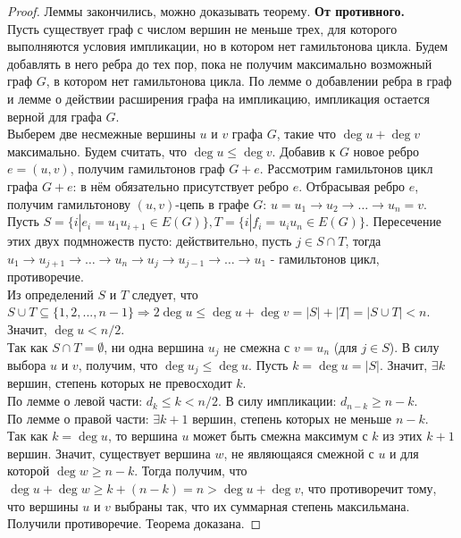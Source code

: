 \documentclass[10pt,a4paper]{article}
\begin{document}
\begin{enumerate}
\begin{proof}
	Леммы закончились, можно доказывать теорему. \textbf{От противного.}\\
	Пусть существует граф с числом вершин не меньше трех, для которого выполняются условия импликации, но в котором нет гамильтонова цикла. Будем добавлять в него ребра до тех пор, пока не получим максимально возможный граф $G$, в котором нет гамильтонова цикла. По лемме о добавлении ребра в граф и лемме о действии расширения графа на импликацию, импликация остается верной для графа $G$.\\
	Выберем две несмежные вершины $u$ и $v$ графа $G$, такие что $\deg u + \deg v$ максимально. Будем считать, что $\deg u \leq \deg v$. Добавив к $G$ новое ребро $e = (u,v)$, получим гамильтонов граф $G + e$. Рассмотрим гамильтонов цикл графа $G + e$: в нём обязательно присутствует ребро $e$. Отбрасывая ребро $e$, получим гамильтонову $(u, v)$-цепь в графе $G$: $u = u_1 \rightarrow u_2 \rightarrow \ldots \rightarrow u_n = v$.\\
	Пусть $S = \{ i | e_i = u_1 u_{i + 1} \in E(G)\}, T = \{ i |f_i = u_i u_n \in E(G)\}$. Пересечение этих двух подмножеств пусто: действительно, пусть $j \in S \cap T$, тогда $u_1 \rightarrow u_{j + 1} \rightarrow \ldots \rightarrow u_n \rightarrow u_j \rightarrow u_{j - 1} \rightarrow \ldots \rightarrow u_1$ - гамильтонов цикл, противоречие.\\
	Из определений $S$ и $T$ следует, что $S \cup T \subseteq \{1, 2, ..., n - 1 \} \Rightarrow 2 \deg u \leq \deg u + \deg v = |S| + |T| = |S \cup T| < n$. Значит, $\deg u < n/2$.\\
	Так как $S \cap T  = \emptyset$, ни одна вершина $ u_j $ не смежна с $ v = u_n $ (для $ j \in S $). В силу выбора $ u $ и $ v $, получим, что $ \deg u_j \leq \deg u $. Пусть $ k = \deg u = |S| $. Значит, $ \exists k $ вершин, степень которых не превосходит $k$.\\
	По лемме о левой части: $d_k \leq k < n/2$. В силу импликации: $ d_{n - k} \geq n - k$.\\
	По лемме о правой части: $\exists k + 1$ вершин, степень которых не меньше $n - k$.\\
	Так как $ k = \deg u $, то вершина $u$ может быть смежна максимум с $k$ из этих $k+1$ вершин. Значит, существует вершина $w$, не являющаяся смежной с $u$ и для которой $ \deg w \geq n - k $. Тогда получим, что $ \deg u + \deg w \geq k + (n - k) = n > \deg u + \deg v $, что противоречит тому, что вершины $u$ и $v$ выбраны так, что их суммарная степень максильмана.\\
	Получили противоречие. Теорема доказана.			
	\end{proof}
\end{enumerate}
\end{document}

